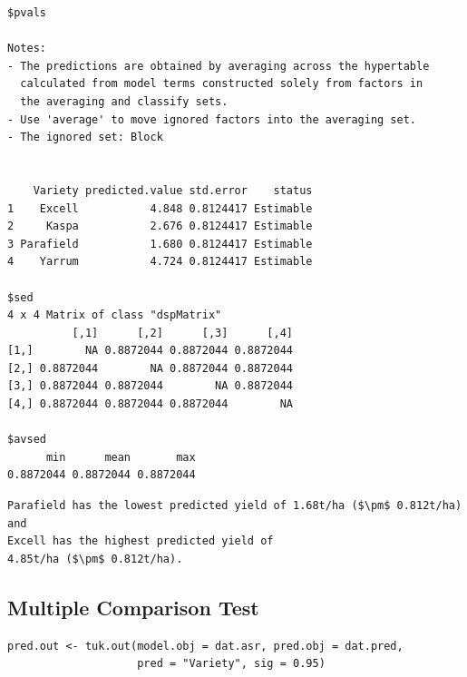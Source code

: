 \documentclass[a4paper, 10pt, fleqn, twosided]{memoir}
\begin{document}
\begin{tcolorbox}[title = Example 3 Predicted output]
\begin{verbatim}
$pvals

Notes:
- The predictions are obtained by averaging across the hypertable
  calculated from model terms constructed solely from factors in
  the averaging and classify sets.
- Use 'average' to move ignored factors into the averaging set.
- The ignored set: Block


    Variety predicted.value std.error    status
1    Excell           4.848 0.8124417 Estimable
2     Kaspa           2.676 0.8124417 Estimable
3 Parafield           1.680 0.8124417 Estimable
4    Yarrum           4.724 0.8124417 Estimable

$sed
4 x 4 Matrix of class "dspMatrix"
          [,1]      [,2]      [,3]      [,4]
[1,]        NA 0.8872044 0.8872044 0.8872044
[2,] 0.8872044        NA 0.8872044 0.8872044
[3,] 0.8872044 0.8872044        NA 0.8872044
[4,] 0.8872044 0.8872044 0.8872044        NA

$avsed
      min      mean       max
0.8872044 0.8872044 0.8872044
\end{verbatim}
\end{tcolorbox}

\begin{tcolorbox}[title = Example 3 Prediction interpretation]
\begin{lstlisting}
Parafield has the lowest predicted yield of 1.68t/ha ($\pm$ 0.812t/ha) and
Excell has the highest predicted yield of
4.85t/ha ($\pm$ 0.812t/ha).
\end{lstlisting}
\end{tcolorbox}

\clearpage
\subsection{Multiple Comparison Test}

\begin{tcolorbox}[title = Example 3 Tukey's multiple comparison]
\begin{verbatim}
pred.out <- tuk.out(model.obj = dat.asr, pred.obj = dat.pred,
                    pred = "Variety", sig = 0.95)
\end{verbatim}
\end{tcolorbox}
\end{document}

